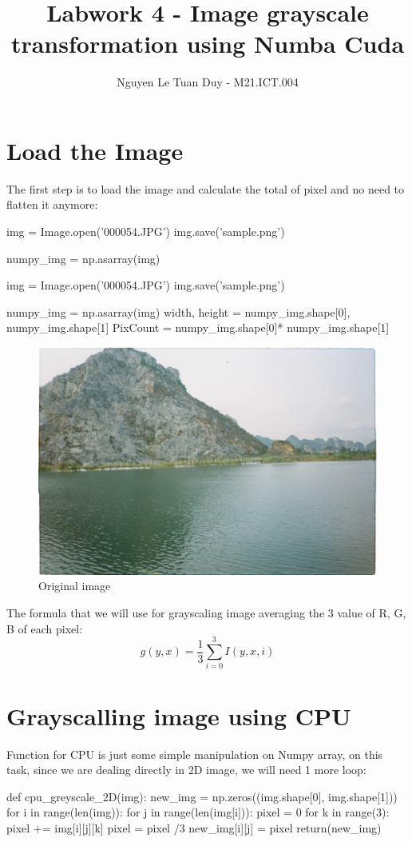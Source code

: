 \documentclass{article}
\title{Labwork 4 - Image grayscale transformation using Numba Cuda}
\author{Nguyen Le Tuan Duy - M21.ICT.004}
\date{}
\begin{document}
\maketitle
\section{Load the Image}
The first step is to load the image and calculate the total of pixel and no need to flatten it anymore:

\begin{python}
img = Image.open('000054.JPG')
img.save('sample.png')
 
numpy_img = np.asarray(img)

img = Image.open('000054.JPG')
img.save('sample.png')
 
numpy_img = np.asarray(img)
width, height = numpy_img.shape[0], numpy_img.shape[1]
PixCount = numpy_img.shape[0]* numpy_img.shape[1]
\end{python}

\begin{figure}
    \begin{center}
        \includegraphics[scale=0.08]{000054.JPG}
        \caption{Original image}
    \end{center}
\end{figure}

The formula that we will use for grayscaling image averaging the 3 value of R, G, B of each pixel:
\begin{equation}
    g(y,x) = \frac{1}{3}\sum_{i=0}^{3}I(y,x,i)
\end{equation}

\section{Grayscalling image using CPU}
Function for CPU is just some simple manipulation on Numpy array, on this task, since we are dealing directly in 2D image, we will need 1 more loop:
\begin{python}
def cpu_greyscale_2D(img):
  new_img = np.zeros((img.shape[0], img.shape[1]))
  for i in range(len(img)):
    for j in range(len(img[i])):
      pixel = 0
      for k in range(3):
        pixel += img[i][j][k]
      pixel = pixel /3
      new_img[i][j] = pixel
  return(new_img)
\end{python}
\end{document}
